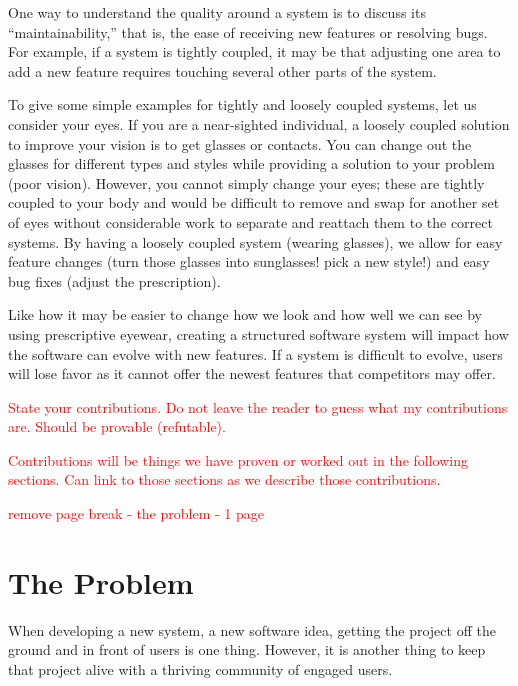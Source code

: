 \documentclass[12pt,conference]{IEEEtran}
\newcommand\todo[1]{\textcolor{red}{#1}}
\begin{document}
One way to understand the quality around a system is to discuss its ``maintainability,'' that is, the ease of receiving new features or resolving bugs. For example, if a system is tightly coupled, it may be that adjusting one area to add a new feature requires touching several other parts of the system.

To give some simple examples for tightly and loosely coupled systems, let us consider your eyes. If you are a near-sighted individual, a loosely coupled solution to improve your vision is to get glasses or contacts. You can change out the glasses for different types and styles while providing a solution to your problem (poor vision). However, you cannot simply change your eyes; these are tightly coupled to your body and would be difficult to remove and swap for another set of eyes without considerable work to separate and reattach them to the correct systems. By having a loosely coupled system (wearing glasses), we allow for easy feature changes (turn those glasses into sunglasses! pick a new style!) and easy bug fixes (adjust the prescription).

Like how it may be easier to change how we look and how well we can see by using prescriptive eyewear, creating a structured software system will impact how the software can evolve with new features. If a system is difficult to evolve, users will lose favor as it cannot offer the newest features that competitors may offer.

\todo{State your contributions. Do not leave the reader to guess what my contributions are. Should be provable (refutable).}

\todo{Contributions will be things we have proven or worked out in the following sections. Can link to those sections as we describe those contributions.}

\newpage \todo{remove page break - the problem - 1 page}

\section{The Problem}


When developing a new system, a new software idea, getting the project off the ground and in front of users is one thing. However, it is another thing to keep that project alive with a thriving community of engaged users.
\end{document}
